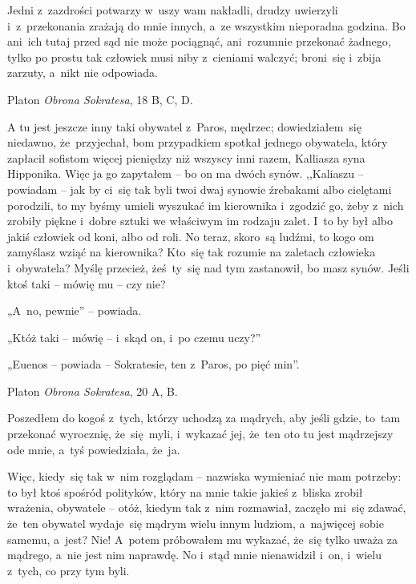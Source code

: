 \documentclass[a4paper,11pt]{article}
\newcommand{\attribA}[1]{#1}
\begin{document}
Jedni z~zazdrości potwarzy w~uszy wam nakładli, drudzy uwierzyli
i~z~przekonania zrażają do mnie innych, a~ze wszystkim nieporadna
godzina. Bo ani~ich tutaj przed sąd nie może pociągnąć, ani~rozumnie
przekonać żadnego, tylko po prostu tak człowiek musi niby z~cieniami
walczyć; broni~się i~zbija zarzuty, a~nikt nie odpowiada.


\attribA{Platon \textit{Obrona Sokratesa}, 18 B, C, D.}

\vspace{\spaceThree}



A tu jest jeszcze inny taki obywatel z~Paros, mędrzec;
dowiedziałem~się niedawno, że~przyjechał, bom przypadkiem spotkał
jednego obywatela, który zapłacił sofistom więcej pieniędzy niż
wszyscy inni razem, Kalliasza syna Hipponika. Więc ja go zapytałem --
bo on ma dwóch synów. ,,Kaliaszu -- powiadam -- jak by ci~się tak byli
twoi dwaj synowie źrebakami albo cielętami porodzili, to my byśmy
umieli wyszukać im kierownika i~zgodzić go, żeby z~nich zrobiły piękne
i~dobre sztuki we właściwym im rodzaju zalet. I~to by był albo jakiś
człowiek od koni, albo od roli. No teraz, skoro~są ludźmi, to kogo om
zamyślasz wziąć na kierownika? Kto~się tak rozumie na zaletach
człowieka i~obywatela? Myślę przecież, żeś~ty~się nad tym zastanowił,
bo masz synów. Jeśli ktoś taki -- mówię mu -- czy nie?

„A~no, pewnie” -- powiada.

„Któż taki -- mówię -- i~skąd on, i~po czemu uczy?”

„Euenos -- powiada -- Sokratesie, ten z~Paros, po pięć min”.


\attribA{Platon \textit{Obrona Sokratesa}, 20 A, B.}

\vspace{\spaceThree}



Poszedłem do kogoś z~tych, którzy uchodzą za mądrych, aby jeśli gdzie,
to~tam przekonać wyrocznię, że~się~myli, i~wykazać jej, że~ten oto tu
jest mądrzejszy ode mnie, a~tyś powiedziała, że~ja.

Więc, kiedy~się tak w~nim rozglądam -- nazwiska wymieniać nie mam
potrzeby: to był ktoś spośród polityków, który na mnie takie jakieś
z~bliska zrobił wrażenia, obywatele -- otóż, kiedym tak z~nim
rozmawiał, zaczęło mi~się zdawać, że~ten obywatel wydaje~się mądrym
wielu innym ludziom, a~najwięcej sobie samemu, a~jest? Nie! A~potem
próbowałem mu wykazać, że~się tylko uważa za mądrego, a~nie jest nim
naprawdę. No i~stąd mnie nienawidził i~on, i~wielu z~tych, co przy tym
byli.
\end{document}
